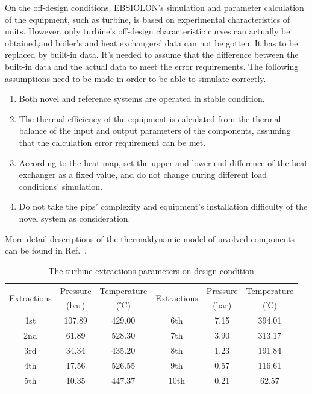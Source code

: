 \documentclass[preprint,12pt]{elsarticle}
\begin{document}
On the off-design conditions, EBSIOLON's simulation and parameter calculation of the equipment, such as turbine, is based on experimental characteristics of units.
However, only turbine's off-design characteristic curves can actually be obtained,and boiler's and heat exchangers' data can not be gotten.
It has to be replaced by built-in data.
It’s needed to assume that the difference between the built-in data and the actual data to meet the error requirements.
The following assumptions need to be made in order to be able to simulate correctly.
\begin{enumerate}[(1)]
\item Both novel and reference systems are operated in stable condition.
\item The thermal efficiency of the equipment is calculated from the thermal balance of the input and output parameters of the components, assuming that the calculation error requirement can be met.
\item According to the heat map, set the upper and lower end difference of the heat exchanger as a fixed value, and do not change during different load conditions' simulation.
\item Do not take the pips' complexity and equipment’s installation difficulty of the novel system as consideration.
\end{enumerate}
More detail descriptions of the thermaldynamic model of involved components can be found in Ref.~\cite{Yao2017Multi}.

\begin{table}
\caption{The turbine extractions parameters on design condition}
\label{table:extractions_parameter}
\begin{centering}
\begin{tabular}{cccccc}
\toprule 
\multirow{2}{*}{Extractions} & Pressure & Temperature & \multirow{2}{*}{Extractions} & Pressure & Temperature\tabularnewline
 & (bar) & (℃) &  & (bar) & (℃)\tabularnewline
\midrule
1st & 107.89  & 429.00 & 6th & 7.15  & 394.01 \tabularnewline
2nd & 61.89 & 528.30  & 7th & 3.90  & 313.17\tabularnewline
3rd & 34.34 & 435.20  & 8th & 1.23  & 191.84\tabularnewline
4th & 17.56  & 526.55  & 9th & 0.57  & 116.61\tabularnewline
5th & 10.35  & 447.37 & 10th & 0.21 & 62.57\tabularnewline
\bottomrule
\end{tabular}
\par\end{centering}
\end{table}
\end{document}
